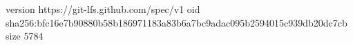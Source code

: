 version https://git-lfs.github.com/spec/v1
oid sha256:bfc16e7b90880b58b186971183a83b6a7bc9adac095b2594015c939db20dc7cb
size 5784
